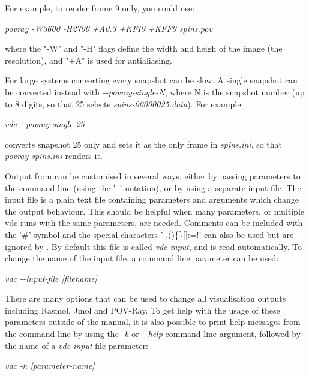 For example, to render frame 9 only, you could use:

\noindent
\begin{minipage}[c]{\textwidth}
\centering
\textit{povray -W3600 -H2700 +A0.3 +KFI9 +KFF9 spins.pov}
\end{minipage}

\noindent where the "-W" and "-H" flags define the width and heigh of the image
(the resolution), and "+A" is used for antialiasing.

For large systems converting every snapshot can be slow. A single snapshot can
be converted instead with \textit{-{}-povray-single-N}, where N is the snapshot
number (up to 8 digits, so that 25 selects \textit{spins-00000025.data}). For
example

\noindent
\begin{minipage}[c]{\textwidth}
\centering
\textit{vdc -{}-povray-single-25}
\end{minipage}

\noindent converts snapshot 25 only and sets it as the only frame in
\textit{spins.ini}, so that \textit{povray spins.ini} renders it.

Output from \vdc can be customised in several ways, either by passing parameters
to the command line (using the '\textit{--}' notation), or by using a separate
\vdc input file. The \vdc input file is a plain text file containing parameters
and arguments which change the output behaviour. This should be helpful when
many parameters, or multiple vdc runs with the same parameters, are needed.
Comments can be included with the '\#' symbol and the special characters
' ,()\{\}[]:=!' can also be used but are ignored by \vdc.  By default this file
is called \textit{vdc-input}, and is read automatically. To change the name of
the \vdc input file, a command line parameter can be used:

\noindent
\begin{minipage}[c]{\textwidth}
\centering
\textit{vdc -{}-input-file [filename]}
\end{minipage}

There are many options that can be used to change all visualisation outputs
including Rasmol, Jmol and POV-Ray. To get help with the usage of these
parameters outside of the manual, it is also possible to print help messages
from the command line by using the \textit{-h} or \textit{-{}-help} command line
argument, followed by the name of a \textit{vdc-input} file parameter:

\noindent
\begin{minipage}[c]{\textwidth}
\centering
\textit{vdc -h [parameter-name]}
\end{minipage}

